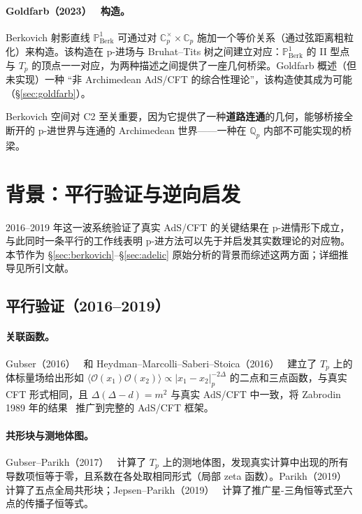 \documentclass[11pt,a4paper]{ctexart}
\theoremstyle{remark}
\newcommand{\Qp}{\mathbb{Q}_p}
\newcommand{\Cp}{\mathbb{C}_p}
\newcommand{\PoneBerk}{\mathbb{P}^1_{\mathrm{Berk}}}
\newcommand{\Tp}{T_p}
\newcommand{\OO}{\mathcal{O}}
\newcommand{\BirTits}{Bruhat--Tits}
\newcommand{\normp}[1]{|#1|_p}
\begin{document}
\paragraph{Goldfarb（2023）~\cite{G23} 构造。}
Berkovich 射影直线 $\PoneBerk$ 可通过对 $\Cp^\times \times \Cp$ 施加一个等价关系（通过弦距离粗粒化）来构造。该构造在 p-进场与 \BirTits{} 树之间建立对应：$\PoneBerk$ 的 II 型点与 $\Tp$ 的顶点一一对应，为两种描述之间提供了一座几何桥梁。Goldfarb 概述（但未实现）一种 ``非 Archimedean AdS/CFT 的综合性理论''，该构造使其成为可能（\S\ref{sec:goldfarb}）。

Berkovich 空间对 C2 至关重要，因为它提供了一种\textbf{道路连通}的几何，能够桥接全断开的 p-进世界与连通的 Archimedean 世界——一种在 $\Qp$ 内部不可能实现的桥梁。

\section{背景：平行验证与逆向启发}
\label{sec:parallel}
\label{sec:reverse}

2016--2019 年这一波系统验证了真实 AdS/CFT 的关键结果在 p-进情形下成立，与此同时一条平行的工作线表明 p-进方法可以先于并启发其实数理论的对应物。本节作为 \S\ref{sec:berkovich}--\S\ref{sec:adelic} 原始分析的背景而综述这两方面；详细推导见所引文献。

\subsection{平行验证（2016--2019）}

\paragraph{关联函数。}

Gubser（2016）~\cite{G16} 和 Heydman--Marcolli--Saberi--Stoica（2016）~\cite{HMSS16} 建立了 $\Tp$ 上的体标量场给出形如 $\langle \OO(x_1) \OO(x_2) \rangle \propto \normp{x_1 - x_2}^{-2\Delta}$ 的二点和三点函数，与真实 CFT 形式相同，且 $\Delta(\Delta-d)=m^2$ 与真实 AdS/CFT 中一致，将 Zabrodin 1989 年的结果~\cite{CMZ89} 推广到完整的 AdS/CFT 框架。

\paragraph{共形块与测地体图。}
Gubser--Parikh（2017）~\cite{GP17} 计算了 $\Tp$ 上的测地体图，发现真实计算中出现的所有导数项恒等于零，且系数在各处取相同形式（局部 zeta 函数）。Parikh（2019）~\cite{P19} 计算了五点全局共形块；Jepsen--Parikh（2019）~\cite{JP19a} 计算了推广星-三角恒等式至六点的传播子恒等式。
\end{document}
